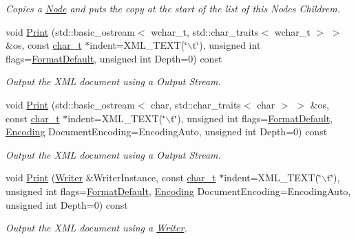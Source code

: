 \begin{DoxyCompactItemize}
\begin{DoxyCompactList}\small\item\em Copies a \hyperlink{classphys_1_1xml_1_1Node}{Node} and puts the copy at the start of the list of this Nodes Childrem. \item\end{DoxyCompactList}\item 
void \hyperlink{classphys_1_1xml_1_1Node_ac705b62114dbc65a204ed2197891322c}{Print} (std::basic\_\-ostream$<$ wchar\_\-t, std::char\_\-traits$<$ wchar\_\-t $>$ $>$ \&os, const \hyperlink{namespacephys_1_1xml_afc87705cd1c2917d87b879715a2d8f6e}{char\_\-t} $\ast$indent=XML\_\-TEXT(\char`\"{}$\backslash$t\char`\"{}), unsigned int flags=\hyperlink{namespacephys_1_1xml_a08bf6aab51f79929d9097706a5e64408}{FormatDefault}, unsigned int Depth=0) const 
\begin{DoxyCompactList}\small\item\em Output the XML document using a Output Stream. \item\end{DoxyCompactList}\item 
void \hyperlink{classphys_1_1xml_1_1Node_aa4076d6ea0db2e5f5c720770bf02349e}{Print} (std::basic\_\-ostream$<$ char, std::char\_\-traits$<$ char $>$ $>$ \&os, const \hyperlink{namespacephys_1_1xml_afc87705cd1c2917d87b879715a2d8f6e}{char\_\-t} $\ast$indent=XML\_\-TEXT(\char`\"{}$\backslash$t\char`\"{}), unsigned int flags=\hyperlink{namespacephys_1_1xml_a08bf6aab51f79929d9097706a5e64408}{FormatDefault}, \hyperlink{namespacephys_1_1xml_a420f5de782438f88160321385bea2015}{Encoding} DocumentEncoding=EncodingAuto, unsigned int Depth=0) const 
\begin{DoxyCompactList}\small\item\em Output the XML document using a Output Stream. \item\end{DoxyCompactList}\item 
void \hyperlink{classphys_1_1xml_1_1Node_adbe10968a804a94552e1dc8223744406}{Print} (\hyperlink{classphys_1_1xml_1_1Writer}{Writer} \&WriterInstance, const \hyperlink{namespacephys_1_1xml_afc87705cd1c2917d87b879715a2d8f6e}{char\_\-t} $\ast$indent=XML\_\-TEXT(\char`\"{}$\backslash$t\char`\"{}), unsigned int flags=\hyperlink{namespacephys_1_1xml_a08bf6aab51f79929d9097706a5e64408}{FormatDefault}, \hyperlink{namespacephys_1_1xml_a420f5de782438f88160321385bea2015}{Encoding} DocumentEncoding=EncodingAuto, unsigned int Depth=0) const 
\begin{DoxyCompactList}\small\item\em Output the XML document using a \hyperlink{classphys_1_1xml_1_1Writer}{Writer}. \item\end{DoxyCompactList}\item 

\end{DoxyCompactItemize}
